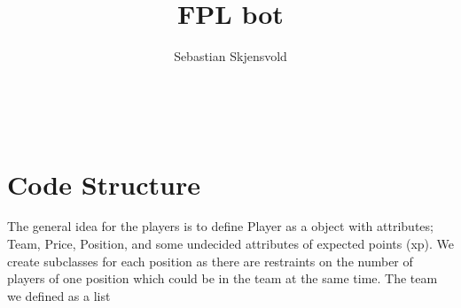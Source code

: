 \documentclass{article}
\title{FPL bot}
\author{Sebastian Skjensvold}
\newcommand{\pb}{\pagebreak \\ \noindent}
\begin{document}
	\maketitle
	\noindent
	\tableofcontents
	\pb
		\section{Code Structure}
		The general idea for the players is to define Player as a object with attributes; Team, Price, Position, and some undecided attributes of expected points (xp). We create subclasses for each position as there are restraints on the number of players of one position which could be in the team at the same time. The team we defined as a list 
\end{document}
